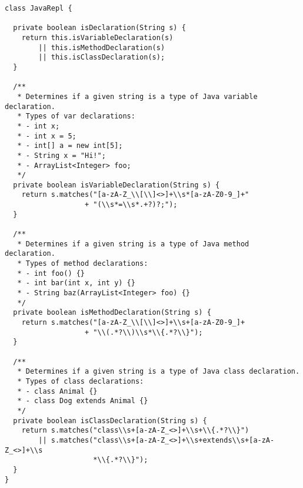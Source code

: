 \begin{lstlisting}[language=MyJava]
class JavaRepl {

  private boolean isDeclaration(String s) {
    return this.isVariableDeclaration(s)
        || this.isMethodDeclaration(s)
        || this.isClassDeclaration(s);
  }

  /**
   * Determines if a given string is a type of Java variable declaration.
   * Types of var declarations:
   * - int x;
   * - int x = 5;
   * - int[] a = new int[5];
   * - String x = "Hi!";
   * - ArrayList<Integer> foo;
   */
  private boolean isVariableDeclaration(String s) {
    return s.matches("[a-zA-Z_\\[\\]<>]+\\s*[a-zA-Z0-9_]+"
                   + "(\\s*=\\s*.+?)?;");
  }

  /**
   * Determines if a given string is a type of Java method declaration.
   * Types of method declarations:
   * - int foo() {}
   * - int bar(int x, int y) {}
   * - String baz(ArrayList<Integer> foo) {}
   */
  private boolean isMethodDeclaration(String s) {
    return s.matches("[a-zA-Z_\\[\\]<>]+\\s+[a-zA-Z0-9_]+
                   + "\\(.*?\\)\\s*\\{.*?\\}");
  }

  /**
   * Determines if a given string is a type of Java class declaration.
   * Types of class declarations:
   * - class Animal {}
   * - class Dog extends Animal {}
   */
  private boolean isClassDeclaration(String s) {
    return s.matches("class\\s+[a-zA-Z_<>]+\\s+\\{.*?\\}") 
        || s.matches("class\\s+[a-zA-Z_<>]+\\s+extends\\s+[a-zA-Z_<>]+\\s
                     *\\{.*?\\}");
  }
}
\end{lstlisting}

